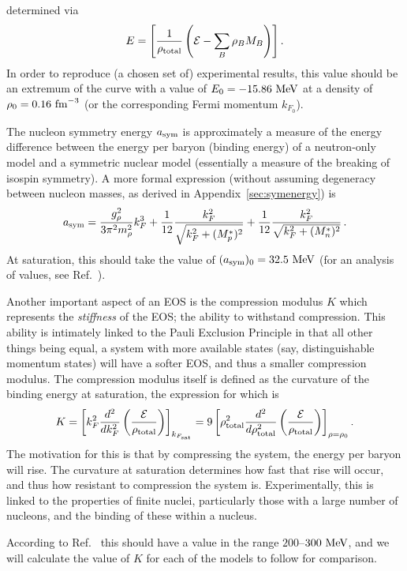 \documentclass[11pt,a4paper,twoside]{carrollthesis}
\newcommand{\be}{\begin{equation}}
\newcommand{\ee}{\end{equation}}
\newcommand{\reci}[1]{\frac{1}{#1}}
\begin{document}
determined via
%
\be \label{eq:EperA} E = \left[ \reci{\rho_{\rm total}} \left( {\cal
    E} -\sum_B \rho_BM_B\right) \right].  \ee
%
In order to reproduce (a chosen set of) experimental results, this
value should be an extremum of the curve with a value of \mbox{$E_0 =
  -15.86~{\rm MeV}$} at a density of \mbox{$\rho_0 = 0.16~{\rm
    fm}^{-3}$} (or the corresponding Fermi momentum $k_{F_0}$).\par
%
The nucleon symmetry energy $a_{\rm sym}$ is approximately a measure
of the energy difference between the energy per baryon (binding
energy) of a neutron-only model and a symmetric nuclear model
(essentially a measure of the breaking of isospin symmetry). A more
formal expression (without assuming degeneracy between nucleon
masses, as derived in Appendix~\ref{sec:symenergy}) is
%
\be \label{eq:a4}
a_{\rm sym} = \frac{g_{\rho}^2}{3 \pi^2 m_\rho^2} k_{F}^3 
+ \reci{12} \frac{k_{F}^2}{\sqrt{k_{F}^2 + (M_p^*)^2}} 
+ \reci{12} \frac{k_{F}^2}{\sqrt{k_{F}^2 + (M_n^*)^2}} \, . 
\ee
%
At saturation, this should take the value of $(a_{\rm sym})_0 =
32.5~{\rm MeV}$ (for an analysis of values, see
Ref.~\cite{Tsang:2008fd}).\par
%
Another important aspect of an EOS is the compression modulus $K$
which represents the \emph{stiffness} of the EOS; the ability to
withstand compression. This ability is intimately linked to the Pauli
Exclusion Principle in that all other things being equal, a system
with more available states (say, distinguishable momentum states) will
have a softer EOS, and thus a smaller compression modulus. The
compression modulus itself is defined as the curvature of the binding
energy at saturation, the expression for which is
%
\be \label{eq:Kmod} K = \left[ k_F^2
  \frac{d^2}{dk_F^2}\left(\frac{\cal E}{\rho_{\rm
      total}}\right)\right]_{k_{F_{\rm sat}}} = 9 \left[ \rho_{\rm
    total}^2 \frac{d^2}{d\rho_{\rm total}^2}\left(\frac{\cal
    E}{\rho_{\rm total}}\right)\right]_{\rho=\rho_0}. \ee
%
The motivation for this is that by compressing the system, the energy
per baryon will rise. The curvature at saturation determines how fast
that rise will occur, and thus how resistant to compression the system
is. Experimentally, this is linked to the properties of finite nuclei,
particularly those with a large number of nucleons, and the binding of
these within a nucleus.\par
%
According to Ref.~\cite{Serot:1984ey} this should have a value in the
range $200$--$300~{\rm MeV}$, and we will calculate the value of
$K$ for each of the models to follow for comparison.\par
%
\end{document}
